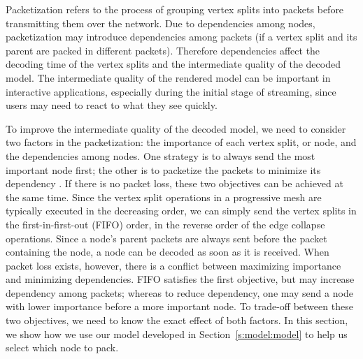 
Packetization refers to the process of grouping vertex splits into packets
before transmitting them over the network.  Due to dependencies among nodes,
packetization may introduce dependencies among packets (if a vertex split and
its parent are packed in different packets).  Therefore dependencies
affect the decoding time of the vertex splits and the intermediate quality of the
decoded model.  The intermediate quality of the rendered model can be 
important in interactive applications, especially during the initial stage of
streaming, since users may need to react to what they see quickly.

To improve the intermediate quality of the decoded model, we need to consider two
factors in the packetization: the importance of each vertex split, or node,
and the dependencies among nodes.  One strategy is to always send the most
important node first; the other is to packetize the packets to minimize its
dependency \cite{Gu:Packetization}.   If there is no packet loss, 
these two objectives can be achieved at the same time.  Since the vertex split operations
in a progressive mesh are typically executed in the decreasing order, we can simply
send the vertex splits in the first-in-first-out (FIFO) order, in the reverse order
of the edge collapse operations.  Since a node's parent packets are
always sent before the packet containing the node, a node can be decoded as
soon as it is received.  When packet loss exists, however, there is a conflict
between maximizing importance and minimizing dependencies.
FIFO satisfies the first objective, but may increase dependency among packets;
whereas to reduce dependency, one may send a node with lower importance
before a more important node. To trade-off between these two
objectives, we need to know the exact effect of both factors. In this section,
we show how we use our model developed in Section~\ref{s:model:model} to
help us select which node to pack.

